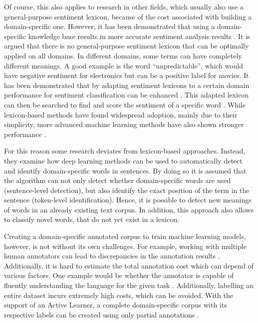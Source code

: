 \documentclass[11pt, a4paper]{article}
\begin{document}
Of course, this also applies to research in other fields, which usually also use a general-purpose sentiment lexicon, 
because of the cost associated with building a domain-specific one. However, it has been demonstrated that using a domain-specific 
knowledge base results in more accurate sentiment analysis results \citep{park2015EfficientExtraction}.
It is argued that there is no general-purpose sentiment lexicon that can be optimally applied on all domains. 
In different domains, some terms can have completely different meanings. A good example is the word “unpredictable”, 
which would have negative sentiment for electronics but can be a positive label for movies. It has been demonstrated 
that by adapting sentiment lexicons to a certain domain performance for sentiment classification can be enhanced 
\citep{Lu2011automaticconstruction}. This adapted lexicon can then be searched to find and score the sentiment 
of a specific word \citep{ashgar2014DetectionSlang}. 
While lexicon-based methods have found widespread adoption, mainly due to their simplicity, more advanced machine 
learning methods have also shown stronger performance \citep{wang2020automaticconstructiondomainsentiment}.

For this reason some research deviates from lexicon-based approaches. Instead, they examine how deep learning methods can be 
used to automatically detect and identify domain-specific words in sentences. By doing so it is assumed that the 
algorithm can not only detect whether domain-specific words are used (sentence-level detection), but also identify 
the exact position of the term in the sentence (token-level identification). Hence, it is possible to detect new meanings 
of words in an already existing text corpus. In addition, this approach also allows to classify novel words, that do not yet 
exist in a lexicon.

Creating a domain-specific annotated corpus to train machine learning models, however, is not without its own challenges. 
For example, working with multiple human annotators can lead to discrepancies in the annotation results \citep{kim2008corpusannotation, rayan2019sentimentanalysisemail}. 
Additionally, it is hard to estimate the total annotation cost which can depend of various factors. One example would be whether the annotator is capable of fluently understanding 
the language for the given task \citep{arora2009estimationgannotationcost}. Additionally, labelling an entire dataset incurs extremely high costs, 
which can be avoided. With the support of an Active Learner, a complete domain-specific corpus with its respective labels can be 
created using only partial annotations \citep{park2015EfficientExtraction}. 
\end{document}
